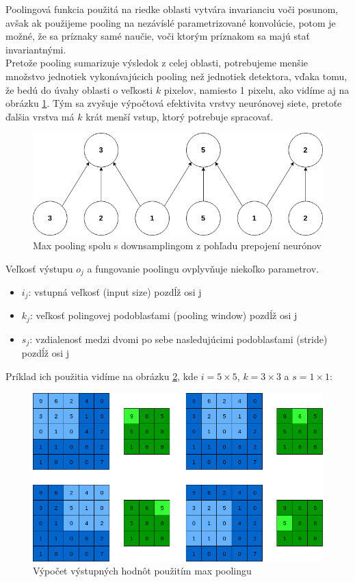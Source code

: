 \indent Poolingová funkcia použitá na riedke oblasti vytvára invarianciu voči posunom, avšak ak použijeme pooling na nezávíslé parametrizované konvolúcie, potom je možné, že sa príznaky samé naučie, voči ktorým príznakom sa majú stať invariantnými\cite{goodfellow2016deep}. \\

\indent Pretože pooling sumarizuje výsledok z celej oblasti, potrebujeme menšie množstvo jednotiek vykonávajúcich pooling než jednotiek detektora, vďaka tomu, že bedú do úvahy oblasti o veľkosti $k$ pixelov, namiesto 1 pixelu, ako vidíme aj na obrázku \ref{fig:pooling}.
Tým sa zvyšuje výpočtová efektivita vrstvy neurónovej siete, pretoťe ďalšia vrstva má $k$ krát menší vstup, ktorý potrebuje spracovať.\cite{goodfellow2016deep} \\

\begin{figure}[H]
	\centering
	\includegraphics[width=0.5\linewidth]{img/pooling}
	\caption{Max pooling spolu s downsamplingom z pohľadu prepojení neurónov}
	\label{fig:pooling}
\end{figure}

Veľkosť výstupu $o_{j}$ a fungovanie poolingu ovplyvňuje niekoľko parametrov.

\begin{itemize}
		\item $i_{j}$: vstupná veľkosť (input size) pozdĺž osi j
		\item $k_{j}$: veľkosť polingovej podoblasťami (pooling window) pozdĺž osi j
		\item $s_{j}$: vzdialenosť medzi dvomi po sebe nasledujúcimi podoblasťami (stride) pozdĺž osi j
\end{itemize}

Príklad ich použitia vidíme na obrázku \ref{fig:poolingex}, kde $i = 5 \times 5$, $k = 3 \times 3$ a  $s = 1 \times 1$:

\begin{figure}[H]
	\centering
	\includegraphics[width=1\linewidth]{img/poolingex}
	\caption{Výpočet výstupných hodnôt použitím max poolingu}
	\label{fig:poolingex}
\end{figure}


